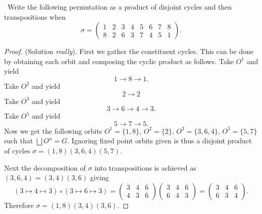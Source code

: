 \documentclass[11pt]{amsart}
\begin{document}
\medskip {}\ Write the following permutation as a product of disjoint cycles and then
transpositions when
\begin{equation*}
	\sigma = \begin{pmatrix}
		1 & 2 & 3 & 4 & 5 & 6 & 7 & 8 \\
		8 & 2 & 6 & 3 & 7 & 4 & 5 & 1
	\end{pmatrix}.
\end{equation*}
\begin{proof}
(Solution \emph{really}). First we gather the constituent cycles. This can be done by obtaining each orbit and composing the cyclic product as follows. Take $O^1$ and yield
\begin{equation*}
	1 \to 8 \to 1.
\end{equation*}
Take $O^2$ and yield \begin{equation*}
	2 \to 2
\end{equation*}
Take $O^3$ and yield
\begin{equation*}
	3 \to 6 \to 4 \to 3.
\end{equation*}
Take $O^5$ and yield
\begin{equation*}
	5 \to 7 \to 5.
\end{equation*}
Now we get the following orbits $O^1 = \{1,8\}$, $O^2 = \{2\}$, $O^3 = \{3,6,4\}$, $O^5 = \{5,7\}$ such that $\bigsqcup O^n = G.$ Ignoring fixed point orbits given is thus a disjoint product of cycles $\sigma = (1,8)(3,6,4)(5,7).$

Next the decomposition of $\sigma$ into transpositions is achieved as $(3,6,4) = (3,4)(3,6)$ giving  
\begin{equation*}
	 (3 \mapsto 4 \mapsto 3)\circ(3 \mapsto 6 \mapsto 3) =\begin{pmatrix}
	 	3 & 4 & 6\\
	 	4 & 3 & 6
	 \end{pmatrix} \begin{pmatrix}
	 	3 & 4 & 6\\
	 	6 & 4 & 3
	 \end{pmatrix} = \begin{pmatrix}
	 	3 & 4 & 6 \\
	 	6 & 3 & 4
	 \end{pmatrix}.
\end{equation*}	
Therefore $\sigma = (1,8)(3,4)(3,6).$
\end{proof}
\end{document}
